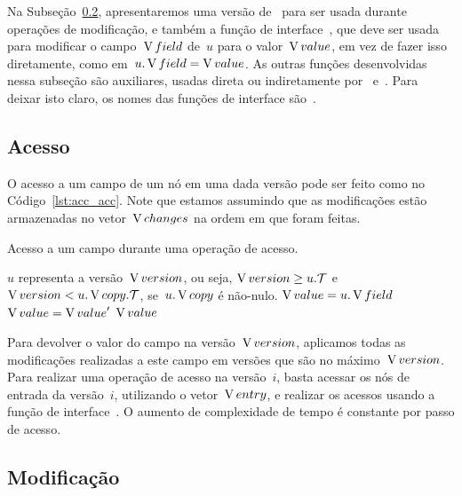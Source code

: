 \documentclass[main.tex]{subfiles}
\begin{document}
\newcommand{\auxfunc}[1]{\underline{#1}}

Na Subseção~\ref{subsec:nodecopying_modificacao}, apresentaremos uma versão de~ para ser usada durante operações de modificação, e também a função de interface~, que deve ser usada para modificar o campo~$\operatorname{V}{field}$ de~$u$ para o valor~$\operatorname{V}{value}$, em vez de fazer isso diretamente, como em~${u.\operatorname{V}{field} = \operatorname{V}{value}}$. As outras funções desenvolvidas nessa subseção são auxiliares, usadas direta ou indiretamente por~ e~. Para deixar isto claro, os nomes das funções de interface são~.

\subsection{Acesso} \label{subsec:nodecopying_acesso}

O acesso a um campo de um nó em uma dada versão pode ser feito como no Código~\ref{lst:acc_acc}. Note que estamos assumindo que as modificações estão armazenadas no vetor~$\operatorname{V}{changes}$ na ordem em que foram feitas.

\begin{algorithm}
\caption{Acesso a um campo durante uma operação de acesso.} \label{lst:acc_acc}
\begin{algorithmic}[1]

\Require $u$ representa a versão~$\operatorname{V}{version}$, ou seja, $\operatorname{V}{version} \geq u.\mathcal{T}$ e~$\operatorname{V}{version} < u.\operatorname{V}{copy}.\mathcal{T}$, se~$u.\operatorname{V}{copy}$ é não-nulo.
	\State $\operatorname{V}{value} = u.\operatorname{V}{field}$
			\State $\operatorname{V}{value} = \operatorname{V}{value}'$
		\EndIf
	\EndFor
	\State \Return $\operatorname{V}{value}$
\EndFunction

\end{algorithmic}
\end{algorithm}

Para devolver o valor do campo na versão~$\operatorname{V}{version}$, aplicamos todas as modificações realizadas a este campo em versões que são no máximo~$\operatorname{V}{version}$. Para realizar uma operação de acesso na versão~$i$, basta acessar os nós de entrada da versão~$i$, utilizando o vetor~$\operatorname{V}{entry}$, e realizar os acessos usando a função de interface~. O aumento de complexidade de tempo é constante por passo de acesso.

\subsection{Modificação} \label{subsec:nodecopying_modificacao}
\end{document}
